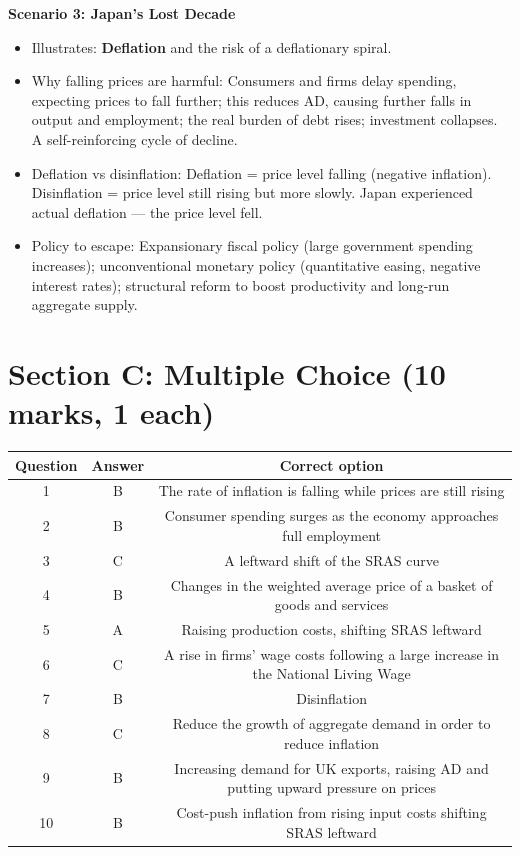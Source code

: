 \documentclass[12pt,a4paper]{article}
\begin{document}
\textbf{Scenario 3: Japan's Lost Decade}
\begin{itemize}
    \item Illustrates: \textbf{Deflation} and the risk of a deflationary spiral.
    \item Why falling prices are harmful: Consumers and firms delay spending, expecting prices to fall further; this reduces AD, causing further falls in output and employment; the real burden of debt rises; investment collapses. A self-reinforcing cycle of decline.
    \item Deflation vs disinflation: Deflation = price level falling (negative inflation). Disinflation = price level still rising but more slowly. Japan experienced actual deflation --- the price level fell.
    \item Policy to escape: Expansionary fiscal policy (large government spending increases); unconventional monetary policy (quantitative easing, negative interest rates); structural reform to boost productivity and long-run aggregate supply.
\end{itemize}

\newpage

\section*{Section C: Multiple Choice (10 marks, 1 each)}

\vspace{0.5em}

\begin{table}[h]
    \centering
    \renewcommand{\arraystretch}{1.3}
    \begin{tabular}{@{}ccc@{}}
        \toprule
        \textbf{Question} & \textbf{Answer} & \textbf{Correct option} \\ \midrule
        1  & B & The rate of inflation is falling while prices are still rising \\
        2  & B & Consumer spending surges as the economy approaches full employment \\
        3  & C & A leftward shift of the SRAS curve \\
        4  & B & Changes in the weighted average price of a basket of goods and services \\
        5  & A & Raising production costs, shifting SRAS leftward \\
        6  & C & A rise in firms' wage costs following a large increase in the National Living Wage \\
        7  & B & Disinflation \\
        8  & C & Reduce the growth of aggregate demand in order to reduce inflation \\
        9  & B & Increasing demand for UK exports, raising AD and putting upward pressure on prices \\
        10 & B & Cost-push inflation from rising input costs shifting SRAS leftward \\ \bottomrule
    \end{tabular}
\end{table}
\end{document}
